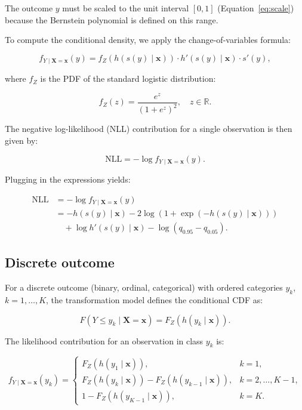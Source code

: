 The outcome $y$ must be scaled to the unit interval $[0, 1]$ (Equation~\ref{eq:scale}) because the Bernstein polynomial is defined on this range.


To compute the conditional density, we apply the change-of-variables formula:

\begin{equation*}
f_{Y \mid \mathbf{X} = \mathbf{x}}(y) = f_Z(h(s(y) \mid \mathbf{x})) \cdot h'(s(y) \mid \mathbf{x}) \cdot s'(y),
\end{equation*}

where $f_Z$ is the PDF of the standard logistic distribution:

\begin{equation*}
f_Z(z) = \frac{e^z}{(1 + e^z)^2}, \quad z \in \mathbb{R}.
\end{equation*}

The negative log-likelihood (NLL) contribution for a single observation is then given by:

\begin{equation*}
\text{NLL} = - \log f_{Y \mid \mathbf{X} = \mathbf{x}}(y).
\end{equation*}

Plugging in the expressions yields:

\begin{align*}
\text{NLL} &= - \log f_{Y \mid \mathbf{X} = \mathbf{x}}(y) \nonumber \\
&= -h(s(y) \mid \mathbf{x}) - 2 \log(1 + \exp(-h(s(y) \mid \mathbf{x}))) \nonumber \\
&\quad + \log h'(s(y) \mid \mathbf{x}) - \log(q_{0.95} - q_{0.05}).
\end{align*}


\subsection{Discrete outcome} \label{sec:disc}

For a discrete outcome (binary, ordinal, categorical) with ordered categories $y_k$, $k = 1, \ldots, K$, the transformation model defines the conditional CDF as:

\begin{equation*}
F(Y \leq y_k \mid \mathbf{X} = \mathbf{x}) = F_Z(h(y_k \mid \mathbf{x})).
\end{equation*}

The likelihood contribution for an observation in class $y_k$ is:

\begin{equation*}
f_{Y \mid \mathbf{X} = \mathbf{x}}(y_k) =
\begin{cases}
F_Z(h(y_1 \mid \mathbf{x})), & k = 1, \\
F_Z(h(y_k \mid \mathbf{x})) - F_Z(h(y_{k-1} \mid \mathbf{x})), & k = 2, \ldots, K - 1, \\
1 - F_Z(h(y_{K-1} \mid \mathbf{x})), & k = K.
\end{cases}
\end{equation*}

